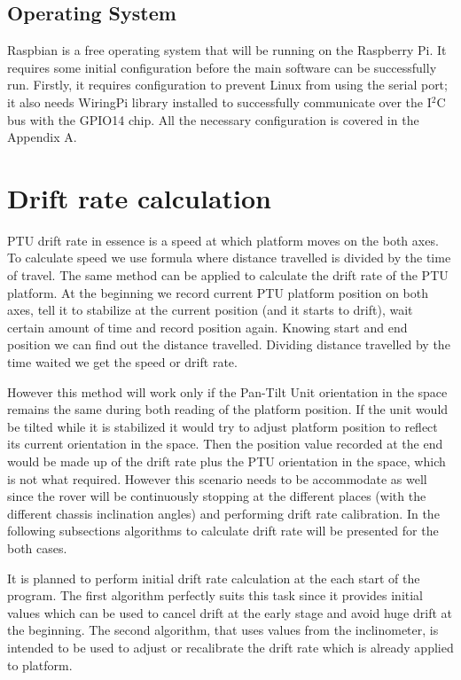 \subsection{Operating System}
Raspbian is a free operating system that will be running on the Raspberry Pi. It requires some initial configuration before the main software can be successfully run. Firstly, it requires configuration to prevent Linux from using the serial port; it also needs WiringPi library \cite{WiringPi} installed to successfully communicate over the I$^2$C bus with the GPIO14 chip. All the necessary configuration is covered in the Appendix A. 

\section{Drift rate calculation}
\label{Drift rate calculation}
PTU drift rate in essence is a speed at which platform moves on the both axes. To calculate speed we use formula where distance travelled is divided by the time of travel. The same method can be applied to calculate the drift rate of the PTU platform. At the beginning we record current PTU platform position on both axes, tell it to stabilize at the current position (and it starts to drift), wait certain amount of time and record position again. Knowing start and end position we can find out the distance travelled. Dividing distance travelled by the time waited we get the speed or drift rate. 

However this method will work only if the Pan-Tilt Unit orientation in the space remains the same during both reading of the platform position. If the unit would be tilted while it is stabilized it would try to adjust platform position to reflect its current orientation in the space. Then the position value recorded at the end would be made up of the drift rate plus the PTU orientation in the space, which is not what required. However this scenario needs to be accommodate as well since the rover will be continuously stopping at the different places (with the different chassis inclination angles) and performing drift rate calibration. In the following subsections algorithms to calculate drift rate will be presented for the both cases. 

It is planned to perform initial drift rate calculation at the each start of the program. The first algorithm perfectly suits this task since it provides initial values which can be used to cancel drift at the early stage and avoid huge drift at the beginning. The second algorithm, that uses values from the inclinometer, is intended to be used to adjust or recalibrate the drift rate which is already applied to platform. 

